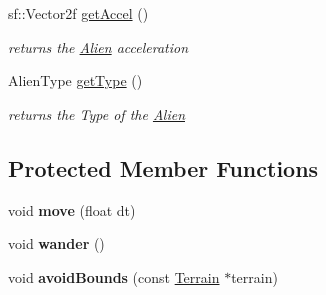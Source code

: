 \begin{DoxyCompactItemize}
\mbox{\label{class_alien_a00f66939b33c32f9f5f11f0097b7734b}} 
sf\+::\+Vector2f \hyperlink{class_alien_a00f66939b33c32f9f5f11f0097b7734b}{get\+Accel} ()
\begin{DoxyCompactList}\small\item\em returns the \hyperlink{class_alien}{Alien} acceleration \end{DoxyCompactList}\item 
\mbox{\label{class_alien_afaa2d6ceb2bd11b135b22db941d4a1a1}} 
Alien\+Type \hyperlink{class_alien_afaa2d6ceb2bd11b135b22db941d4a1a1}{get\+Type} ()
\begin{DoxyCompactList}\small\item\em returns the Type of the \hyperlink{class_alien}{Alien} \end{DoxyCompactList}\end{DoxyCompactItemize}
\subsection*{Protected Member Functions}
\begin{DoxyCompactItemize}
\item 
\mbox{\label{class_alien_ae7704be3d9ce25c615bc7ba9ac222432}} 
void {\bfseries move} (float dt)
\item 
\mbox{\label{class_alien_a0d5a50d82bd051afcd93b0ca14e93739}} 
void {\bfseries wander} ()
\item 
\mbox{\label{class_alien_aa65980cc0a77a1b346af5ae5b11cba55}} 
void {\bfseries avoid\+Bounds} (const \hyperlink{class_terrain}{Terrain} $\ast$terrain)
\end{DoxyCompactItemize}
